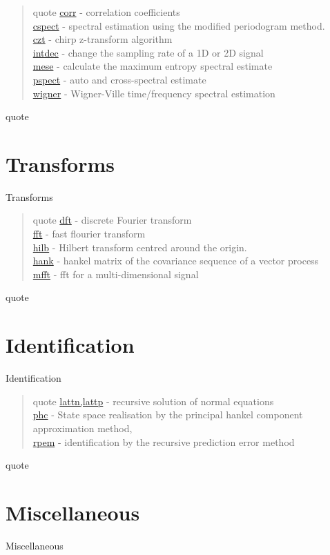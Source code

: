 \begin{quote}{quote}
\noindent
\hyperlink {corr}{corr} - correlation coefficients \\
\hyperlink {cspect}{cspect} - spectral estimation using the modified periodogram method. \\
\hyperlink {czt}{czt} - chirp z-transform algorithm \\
\hyperlink {intdec}{intdec} - change the sampling rate of a 1D or 2D signal \\
\hyperlink {mese}{mese} - calculate the maximum entropy spectral estimate \\
\hyperlink {pspect}{pspect} - auto and cross-spectral estimate \\
\hyperlink {wigner}{wigner} - Wigner-Ville time/frequency spectral estimation 
\end{quote}{quote}

\section{Transforms}{Transforms}
\begin{quote}{quote}
\noindent
\hyperlink {dft}{dft} - discrete Fourier transform \\
\hyperlink {fft}{fft} - fast flourier transform \\
\hyperlink {hilb}{hilb} - Hilbert transform centred around the origin. \\
\hyperlink {hank}{hank} - hankel matrix of the covariance sequence of a vector process \\
\hyperlink {mfft}{mfft} - fft for a multi-dimensional signal  
\end{quote}{quote}

\section{Identification}{Identification}

\begin{quote}{quote}
\noindent
\hyperlink {lattn,lattp}{lattn,lattp} - recursive solution of normal equations \\
\hyperlink {phc}{phc} - State space realisation by the principal hankel component  approximation method, \\
\hyperlink {rpem}{rpem} - identification by the recursive prediction error method 
\end{quote}{quote}


\section{Miscellaneous}{Miscellaneous}

